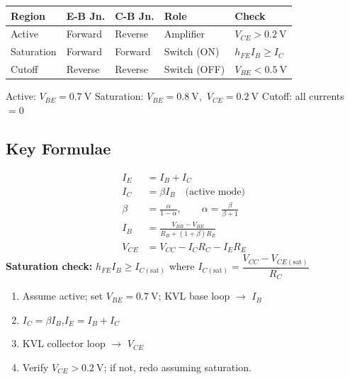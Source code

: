 \documentclass[a4paper, 11pt]{article}
\begin{document}
\begin{center}\renewcommand{\arraystretch}{1.3}
\begin{tabular}{lllll}
\toprule
\textbf{Region} & \textbf{E-B Jn.} & \textbf{C-B Jn.} & \textbf{Role} & \textbf{Check} \\
\midrule
Active     & Forward & Reverse & Amplifier    & $V_{CE}>0.2\ \text{V}$  \\
Saturation & Forward & Forward & Switch (ON)  & $h_{FE}I_B\geq I_C$ \\
Cutoff     & Reverse & Reverse & Switch (OFF) & $V_{BE}<0.5\ \text{V}$ \\
\bottomrule
\end{tabular}
\end{center}

\begin{conceptbox}
Active: $V_{BE}=0.7\ \text{V}$ \enspace\textbullet\enspace
Saturation: $V_{BE}=0.8\ \text{V}$,\ $V_{CE}=0.2\ \text{V}$ \enspace\textbullet\enspace
Cutoff: all currents $=0$
\end{conceptbox}

\subsection{Key Formulae}

\begin{formulabox}
\begin{align*}
  I_E &= I_B + I_C \\
  I_C &= \beta I_B \quad\text{(active mode)} \\
  \beta &= \frac{\alpha}{1-\alpha},\qquad \alpha=\frac{\beta}{\beta+1} \\
  I_B &= \frac{V_{BB}-V_{BE}}{R_B+(1+\beta)R_E} \\
  V_{CE} &= V_{CC} - I_C R_C - I_E R_E
\end{align*}
\textbf{Saturation check:} $h_{FE}I_B\geq I_{C(\text{sat})}$
where $I_{C(\text{sat})}=\dfrac{V_{CC}-V_{CE(\text{sat})}}{R_C}$
\end{formulabox}

\begin{stepsbox}
\begin{enumerate}[noitemsep,topsep=0pt]
  \item Assume active; set $V_{BE}=0.7\ \text{V}$; KVL base loop $\to$ $I_B$
  \item $I_C=\beta I_B$,\quad $I_E=I_B+I_C$
  \item KVL collector loop $\to$ $V_{CE}$
  \item Verify $V_{CE}>0.2\ \text{V}$; if not, redo assuming saturation.
\end{enumerate}
\end{stepsbox}
\end{document}

